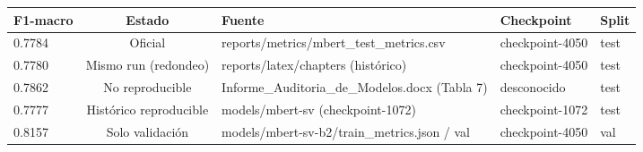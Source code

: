 \begin{tabular}{lclll}
\toprule
F1-macro & Estado & Fuente & Checkpoint & Split \\
\midrule
0.7784 & Oficial & reports/metrics/mbert\_test\_metrics.csv & checkpoint-4050 & test \\
0.7780 & Mismo run (redondeo) & reports/latex/chapters (histórico) & checkpoint-4050 & test \\
0.7862 & No reproducible & Informe\_Auditoria\_de\_Modelos.docx (Tabla 7) & desconocido & test \\
0.7777 & Histórico reproducible & models/mbert-sv (checkpoint-1072) & checkpoint-1072 & test \\
0.8157 & Solo validación & models/mbert-sv-b2/train\_metrics.json / val & checkpoint-4050 & val \\
\bottomrule
\end{tabular}
